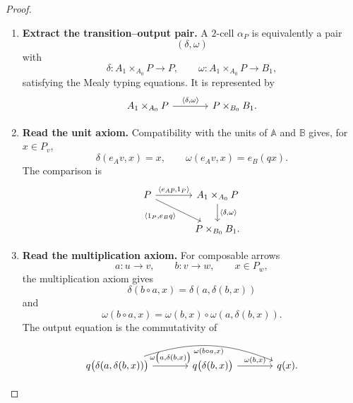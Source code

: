 \begin{proof}
    \leavevmode
    \begin{enumerate}
        \item \textbf{Extract the transition--output pair.}
        A \(2\)-cell \(\alpha_P\) is equivalently a pair
        \[
            (\delta,\omega)
        \]
        with
        \[
            \delta:
            A_1\times_{A_0}P\to P,
            \qquad
            \omega:
            A_1\times_{A_0}P\to B_1,
        \]
        satisfying the Mealy typing equations. It is represented by
        \[
        \begin{tikzcd}[column sep=large]
            A_1\times_{A_0}P
                \arrow[r, "{\langle\delta,\omega\rangle}"]
            &
            P\times_{B_0}B_1.
        \end{tikzcd}
        \]

        \item \textbf{Read the unit axiom.}
        Compatibility with the units of \(\mathbb A\) and \(\mathbb B\)
        gives, for \(x\in P_v\),
        \[
            \delta(e_Av,x)=x,
            \qquad
            \omega(e_Av,x)=e_B(qx).
        \]
        The comparison is
        \[
        \begin{tikzcd}[column sep=large]
            P
                \arrow[r, "{\langle e_Ap,1_P\rangle}"]
                \arrow[dr, "{\langle1_P,e_Bq\rangle}"']
            &
            A_1\times_{A_0}P
                \arrow[d, "{\langle\delta,\omega\rangle}"]
            \\
            &
            P\times_{B_0}B_1.
        \end{tikzcd}
        \]

        \item \textbf{Read the multiplication axiom.}
        For composable arrows
        \[
            a:u\to v,
            \qquad
            b:v\to w,
            \qquad
            x\in P_w,
        \]
        the multiplication axiom gives
        \[
            \delta(b\circ a,x)
            =
            \delta(a,\delta(b,x))
        \]
        and
        \[
            \omega(b\circ a,x)
            =
            \omega(b,x)\circ
            \omega(a,\delta(b,x)).
        \]
        The output equation is the commutativity of
        \[
        \begin{tikzcd}[column sep=large]
            q\bigl(\delta(a,\delta(b,x))\bigr)
                \arrow[
                    r,
                    "{\omega\bigl(a,\delta(b,x)\bigr)}"
                ]
                \arrow[
                    rr,
                    bend left=20,
                    "{\omega(b\circ a,x)}"'
                ]
            &
            q\bigl(\delta(b,x)\bigr)
                \arrow[
                    r,
                    "{\omega(b,x)}"
                ]
            &
            q(x).
        \end{tikzcd}
        \]


\end{enumerate}
\end{proof}
